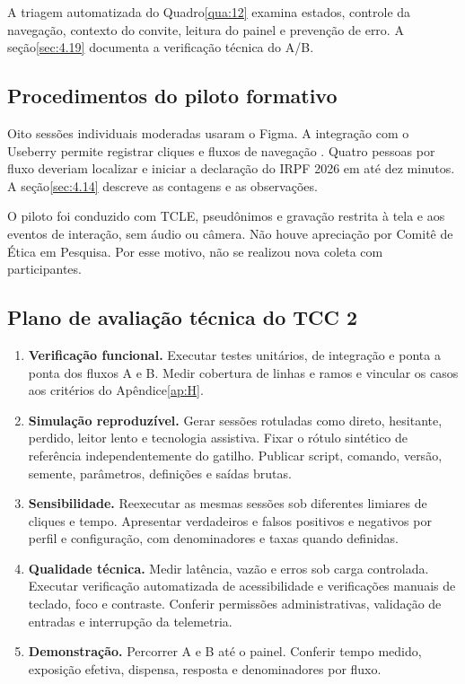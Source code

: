 A triagem automatizada do Quadro\nobreakspace{}\ref{qua:12} examina estados, controle da navegação, contexto do convite, leitura do painel e prevenção de erro. A seção\nobreakspace{}\ref{sec:4.19} documenta a verificação técnica do A/B.

\subsection{Procedimentos do piloto formativo}
\label{sec:3.6.2}

Oito sessões individuais moderadas usaram o Figma. A integração com o Useberry permite registrar cliques e fluxos de navegação \cite{useberry2026}. Quatro pessoas por fluxo deveriam localizar e iniciar a declaração do IRPF 2026 em até dez minutos. A seção\nobreakspace{}\ref{sec:4.14} descreve as contagens e as observações.

O piloto foi conduzido com TCLE, pseudônimos e gravação restrita à tela e aos eventos de interação, sem áudio ou câmera. Não houve apreciação por Comitê de Ética em Pesquisa. Por esse motivo, não se realizou nova coleta com participantes.

\subsection{Plano de avaliação técnica do TCC 2}
\label{sec:3.6.3}

\begin{enumerate}
\def\labelenumi{\arabic{enumi}.}

\item
  \textbf{Verificação funcional.} Executar testes unitários, de integração e ponta a ponta dos fluxos A e B. Medir cobertura de linhas e ramos e vincular os casos aos critérios do Apêndice\nobreakspace{}\ref{ap:H}.
\item
  \textbf{Simulação reproduzível.} Gerar sessões rotuladas como direto, hesitante, perdido, leitor lento e tecnologia assistiva. Fixar o rótulo sintético de referência independentemente do gatilho. Publicar script, comando, versão, semente, parâmetros, definições e saídas brutas.
\item
  \textbf{Sensibilidade.} Reexecutar as mesmas sessões sob diferentes limiares de cliques e tempo. Apresentar verdadeiros e falsos positivos e negativos por perfil e configuração, com denominadores e taxas quando definidas.
\item
  \textbf{Qualidade técnica.} Medir latência, vazão e erros sob carga controlada. Executar verificação automatizada de acessibilidade e verificações manuais de teclado, foco e contraste. Conferir permissões administrativas, validação de entradas e interrupção da telemetria.
\item
  \textbf{Demonstração.} Percorrer A e B até o painel. Conferir tempo medido, exposição efetiva, dispensa, resposta e denominadores por fluxo.
\end{enumerate}

